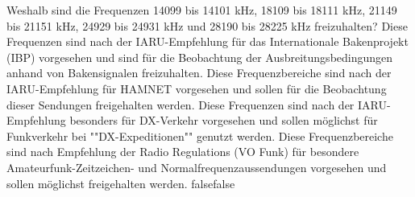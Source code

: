     {Weshalb sind die Frequenzen 14099 bis 14101 kHz, 18109 bis 18111 kHz, 21149 bis 21151 kHz, 24929 bis 24931 kHz und 28190 bis 28225 kHz freizuhalten?}
    {Diese Frequenzen sind nach der IARU-Empfehlung für das Internationale Bakenprojekt (IBP) vorgesehen und sind für die Beobachtung der Ausbreitungsbedingungen anhand von Bakensignalen freizuhalten.}
    {Diese Frequenzbereiche sind nach der IARU-Empfehlung für HAMNET vorgesehen und sollen für die Beobachtung dieser Sendungen freigehalten werden.}
    {Diese Frequenzen sind nach der IARU-Empfehlung besonders für DX-Verkehr vorgesehen und sollen möglichst für Funkverkehr bei ""DX-Expeditionen"" genutzt werden.}
    {Diese Frequenzbereiche sind nach Empfehlung der Radio Regulations (VO Funk) für besondere Amateurfunk-Zeitzeichen- und Normalfrequenzaussendungen vorgesehen und sollen möglichst freigehalten werden.}
    {false}{false}